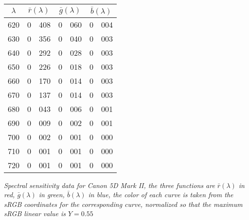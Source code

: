 {{\begin{minipage}{.3\textwidth}
\begin{tabular}{c|r@{.}l | r@{.}l | r@{.}l}
\end{tabular}
\end{minipage}\hskip3mm
\begin{minipage}{.3\textwidth}
\begin{tabular}{c|r@{.}l | r@{.}l | r@{.}l}
$\lambda$ & \multicolumn{2}{c|}{$\bar r(\lambda)$} &  \multicolumn{2}{c|}{$\bar g(\lambda)$} &  \multicolumn{2}{c}{$\bar b(\lambda)$} \\
\hline
 620 &   0&408 &   0&060 &   0&004 \\
 630 &   0&356 &   0&040 &   0&003 \\
 640 &   0&292 &   0&028 &   0&003 \\
 650 &   0&226 &   0&018 &   0&003 \\
 660 &   0&170 &   0&014 &   0&003 \\
 670 &   0&137 &   0&014 &   0&003 \\
 680 &   0&043 &   0&006 &   0&001 \\
 690 &   0&009 &   0&002 &   0&001 \\
 700 &   0&002 &   0&001 &   0&000 \\
 710 &   0&001 &   0&001 &   0&000 \\
 720 &   0&001 &   0&001 &   0&000 \\
\end{tabular}
\end{minipage}
\vskip 1mm
}
\centering
{\footnotesize\it Spectral sensitivity data for Canon 5D Mark II, the three
functions
are $\bar r(\lambda)$ in red, $\bar g(\lambda)$ in green, $\bar b(\lambda)$ in blue,
the color of each curve is taken from the \gls{sRGB} coordinates for the
corresponding
curve, normalized so that the maximum \gls{sRGB} linear value is $Y = 0.55$
}
\label{tab:canon5dmii}
}


